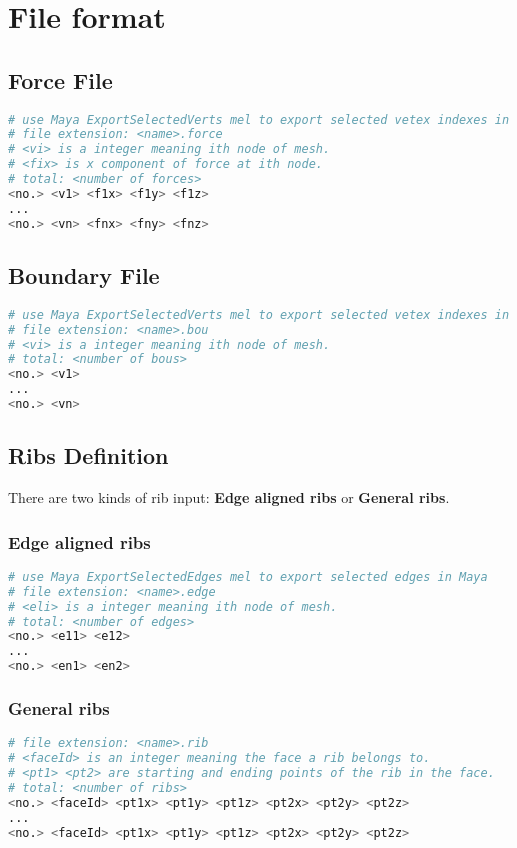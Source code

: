 
\section{File format}

\subsection{Force File}
\begin{lstlisting}[language=python]
# use Maya ExportSelectedVerts mel to export selected vetex indexes in Maya
# file extension: <name>.force
# <vi> is a integer meaning ith node of mesh.
# <fix> is x component of force at ith node.
# total: <number of forces>
<no.> <v1> <f1x> <f1y> <f1z>
...
<no.> <vn> <fnx> <fny> <fnz>
\end{lstlisting}
\subsection{Boundary File}
\begin{lstlisting}[language=python]
# use Maya ExportSelectedVerts mel to export selected vetex indexes in Maya
# file extension: <name>.bou
# <vi> is a integer meaning ith node of mesh.
# total: <number of bous>
<no.> <v1>
...
<no.> <vn>
\end{lstlisting}
\subsection{Ribs Definition}
There are two kinds of rib input: \textbf{Edge aligned ribs} or \textbf{General ribs}.
\subsubsection{Edge aligned ribs}
\begin{lstlisting}[language=python]
# use Maya ExportSelectedEdges mel to export selected edges in Maya
# file extension: <name>.edge
# <eli> is a integer meaning ith node of mesh.
# total: <number of edges>
<no.> <e11> <e12>
...
<no.> <en1> <en2>
\end{lstlisting}
\subsubsection{General ribs}
\begin{lstlisting}[language=python]
# file extension: <name>.rib
# <faceId> is an integer meaning the face a rib belongs to.
# <pt1> <pt2> are starting and ending points of the rib in the face.
# total: <number of ribs>
<no.> <faceId> <pt1x> <pt1y> <pt1z> <pt2x> <pt2y> <pt2z>
...
<no.> <faceId> <pt1x> <pt1y> <pt1z> <pt2x> <pt2y> <pt2z>
\end{lstlisting}	


